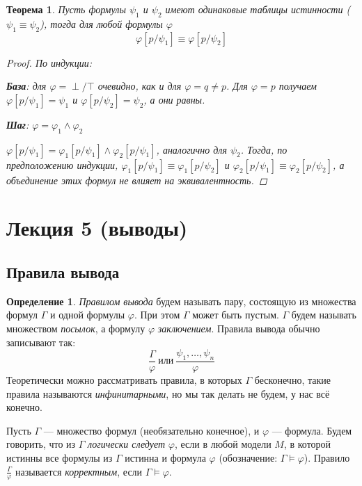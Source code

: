 \documentclass[12pt]{article}
\let\eq\equiv
\let\la\land
\theoremstyle{definition}
\newtheorem{definition}{Определение}[section]
\theoremstyle{plain}
\newtheorem{theorem}{Теорема}[section]
\theoremstyle{remark}
\begin{document}
\begin{theorem}
  Пусть формулы $\psi_1$ и $\psi_2$ имеют одинаковые таблицы
  истинности ($\psi_1 \eq \psi_2$), тогда для любой формулы $\varphi$
  \begin{displaymath}
    \varphi[p/\psi_1] \eq \varphi[p/\psi_2]
  \end{displaymath}
  \begin{proof}
    По индукции:

    \textbf{База}: для $\varphi = \perp / \top$ очевидно, как и для
    $\varphi = q \neq p$. Для $\varphi = p$ получаем $\varphi[p /
    \psi_1] = \psi_1$ и $\varphi[p / \psi_2] = \psi_2$, а они равны.

    \textbf{Шаг}: $\varphi = \varphi_1 \la \varphi_2$

    $\varphi[p / \psi_1] = \varphi_1[p / \psi_1] \la \varphi_2[p /
    \psi_1]$, аналогично для $\psi_2$. Тогда, по предположению
    индукции, $\varphi_1[p / \psi_1] \eq \varphi_1[p / \psi_2]$ и
    $\varphi_2[p / \psi_1] \eq \varphi_2[p / \psi_2]$, а объединение
    этих формул не влияет на эквивалентность.
  \end{proof}
\end{theorem}

\pagebreak

\section{Лекция 5 (выводы)}

\subsection{Правила вывода}

\begin{definition}
  \textit{Правилом вывода} будем называть пару, состоящую из
  множества формул $\Gamma$ и одной формулы $\varphi$. При этом
  $\Gamma$ может быть пустым. $\Gamma$ будем называть множеством
  \textit{посылок}, а формулу $\varphi$ \textit{заключением}. Правила
  вывода обычно записывают так:
  \begin{displaymath}
    \frac{\Gamma}{\varphi}\ \text{или}\ \frac{\psi_1, \dots, \psi_n}{\varphi}
  \end{displaymath}
  Теоретически можно рассматривать правила, в которых $\Gamma$
  бесконечно, такие правила называются \textit{инфинитарными}, но мы
  так делать не будем, у нас всё конечно.

  Пусть $\Gamma$ --- множество формул (необязательно конечное), и
  $\varphi$ --- формула. Будем говорить, что из $\Gamma$
  \textit{логически следует} $\varphi$, если в любой модели $M$, в
  которой истинны все формулы из $\Gamma$ истинна и формула $\varphi$
  (обозначение: $\Gamma \models \varphi$). Правило
  $\frac{\Gamma}{\varphi}$ называется \textit{корректным}, если
  $\Gamma \models \varphi$.
\end{definition}
\end{document}
